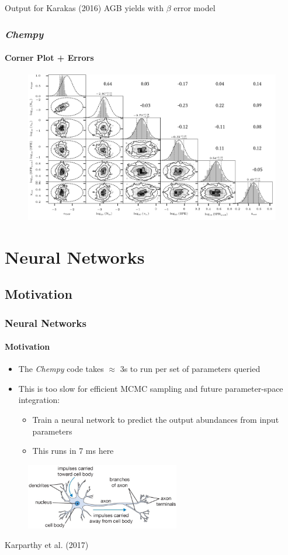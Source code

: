\documentclass{beamer}
\begin{document}
\begin{frame}
Output for Karakas (2016) AGB yields with $\beta$ error model
\frametitle{\textit{Chempy}}
\framesubtitle{Corner Plot  + Errors}
\begin{figure}
\centering
\includegraphics[width=\textwidth]{Karakas16.png}
\end{figure}
\end{frame}

\section{Neural Networks}
\subsection{Motivation}
\begin{frame}
\frametitle{Neural Networks}
\framesubtitle{Motivation}
\begin{itemize}
\item The\textit{ Chempy} code takes $\approx$ 3s to run per set of parameters queried
\item This is too slow for efficient MCMC sampling and future parameter-space integration:
\begin{itemize}
\item Train a neural network to predict the output abundances from input parameters
\item This runs in 7 ms here
\end{itemize}
\end{itemize}
\begin{figure}
\centering
\includegraphics[width=0.6\textwidth]{neuron.png}
\end{figure}
\tiny Karparthy et al. (2017)
\end{frame}
\end{document}

